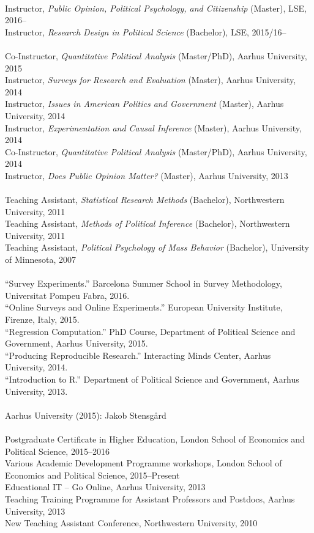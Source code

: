 \documentclass[12pt]{article}
\renewcommand{\section}[1]{\pagebreak[3]%
    \llap{\scshape\smash{\parbox[t]{\marginparwidth}{\raggedright {\color{lg}#1}}}}%
    \vspace{-\baselineskip}\par}
\newcommand{\topic}[1]{\pagebreak[3]\indent {\color{lg}{\footnotesize #1 }}\\}
\newcommand{\entry}[1]{\indent {\color{lg}\guillemotright}\hspace{2pt}#1\vspace{.25em}\\}
\begin{document}
\section{Teaching \&\\ Advising}
\topic{Lecturing: London School of Economics and Political Science}
	\entry{Instructor, \textit{Public Opinion, Political Psychology, and Citizenship} (Master), LSE, 2016--}
	\entry{Instructor, \textit{Research Design in Political Science} (Bachelor), LSE, 2015/16--}
\topic{Lecturing: Aarhus University}
	\entry{Co-Instructor, \textit{Quantitative Political Analysis} (Master/PhD), Aarhus University, 2015}
	\entry{Instructor, \textit{Surveys for Research and Evaluation} (Master), Aarhus University, 2014}
	\entry{Instructor, \textit{Issues in American Politics and Government} (Master), Aarhus University, 2014}
	\entry{Instructor, \textit{Experimentation and Causal Inference} (Master), Aarhus University, 2014}
	\entry{Co-Instructor, \textit{Quantitative Political Analysis} (Master/PhD), Aarhus University, 2014}
	\entry{Instructor, \textit{Does Public Opinion Matter?} (Master), Aarhus University, 2013}
\topic{Class Teaching: Northwestern University}
	\entry{Teaching Assistant, \textit{Statistical Research Methods} (Bachelor), Northwestern University, 2011} %
	\entry{Teaching Assistant, \textit{Methods of Political Inference} (Bachelor), Northwestern University, 2011} %
	\entry{Teaching Assistant, \textit{Political Psychology of Mass Behavior} (Bachelor), University of Minnesota, 2007} %
\topic{Short courses}
	\entry{``Survey Experiments.'' Barcelona Summer School in Survey Methodology, Universitat Pompeu Fabra, 2016.}
	\entry{``Online Surveys and Online Experiments.'' European University Institute, Firenze, Italy, 2015.}
	\entry{``Regression Computation.'' PhD Course, Department of Political Science and Government, Aarhus University, 2015.}
	\entry{``Producing Reproducible Research.'' Interacting Minds Center, Aarhus University, 2014.}
	\entry{``Introduction to R.'' Department of Political Science and Government, Aarhus University, 2013.}
\topic{Master Thesis Supervision}
	\entry{Aarhus University (2015): Jakob Stensg{\aa}rd}
\topic{Pedagogical Training}
	\entry{Postgraduate Certificate in Higher Education, London School of Economics and Political Science, 2015--2016}
	\entry{Various Academic Development Programme workshops, London School of Economics and Political Science, 2015--Present}
	\entry{Educational IT -- Go Online, Aarhus University, 2013}
	\entry{Teaching Training Programme for Assistant Professors and Postdocs, Aarhus University, 2013}
	\entry{New Teaching Assistant Conference, Northwestern University, 2010}
\end{document}
